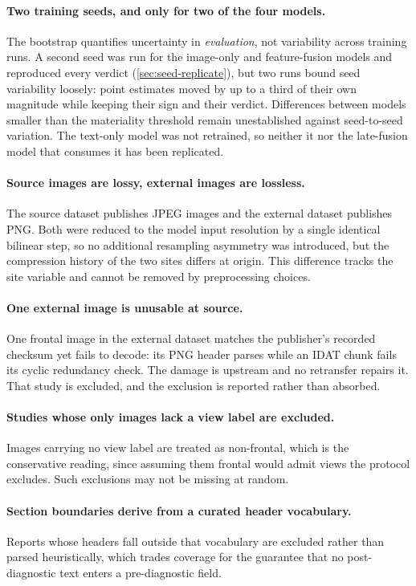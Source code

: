\paragraph{Two training seeds, and only for two of the four models.}
The bootstrap quantifies uncertainty in \emph{evaluation}, not variability
across training runs. A second seed was run for the image-only and
feature-fusion models and reproduced every verdict
(\cref{sec:seed-replicate}), but two runs bound seed variability loosely: point
estimates moved by up to a third of their own magnitude while keeping their
sign and their verdict. Differences between models smaller than the materiality
threshold remain unestablished against seed-to-seed variation. The text-only
model was not retrained, so neither it nor the late-fusion model that consumes
it has been replicated.

\paragraph{Source images are lossy, external images are lossless.}
The source dataset publishes JPEG images and the external dataset publishes PNG.
Both were reduced to the model input resolution by a single identical bilinear
step, so no additional resampling asymmetry was introduced, but the compression
history of the two sites differs at origin. This difference tracks the site
variable and cannot be removed by preprocessing choices.

\paragraph{One external image is unusable at source.}
One frontal image in the external dataset matches the publisher's recorded
checksum yet fails to decode: its PNG header parses while an IDAT chunk fails
its cyclic redundancy check. The damage is upstream and no retransfer repairs
it. That study is excluded, and the exclusion is reported rather than absorbed.

\paragraph{Studies whose only images lack a view label are excluded.}
Images carrying no view label are treated as non-frontal, which is the
conservative reading, since assuming them frontal would admit views the protocol
excludes. Such exclusions may not be missing at random.

\paragraph{Section boundaries derive from a curated header vocabulary.}
Reports whose headers fall outside that vocabulary are excluded rather than
parsed heuristically, which trades coverage for the guarantee that no
post-diagnostic text enters a pre-diagnostic field.

